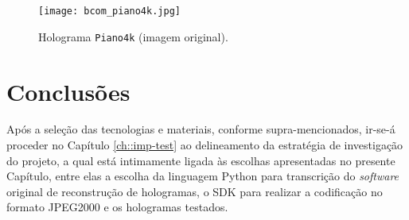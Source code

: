 \begin{figure}
    \centering
    \texttt{[image: bcom\_piano4k.jpg]}
    \caption[Holograma \texttt{Piano4k} (imagem original)]{Holograma \texttt{Piano4k} (imagem original)\cite{Gilles2016,Gilles2016a,holorepo2018}.}
    \label{fig:bcom_piano4k}
\end{figure}


\section{Conclusões}
\label{sec::tecno-ferr:conclusao}

Após a seleção das tecnologias e materiais, conforme supra-mencionados, ir-se-á proceder no Capítulo \ref{ch::imp-test} ao delineamento da estratégia de investigação do projeto, a qual está intimamente ligada às escolhas apresentadas no presente Capítulo, entre elas a escolha da linguagem Python para transcrição do \textit{software} original de reconstrução de hologramas, o \ac{SDK} para realizar a codificação no formato JPEG2000 e os hologramas testados.
